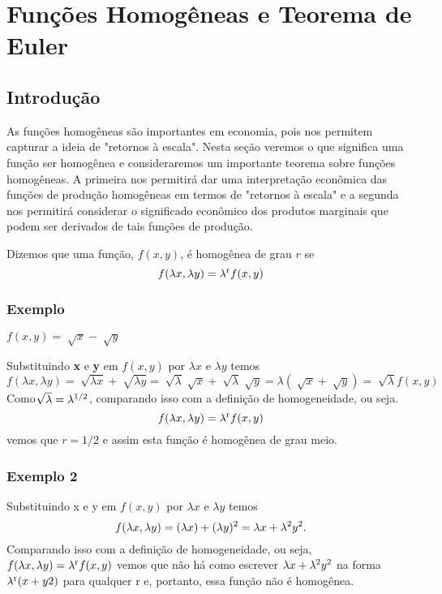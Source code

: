 \documentclass[a4paper]{article}
\begin{document}
\section{Funções Homogêneas e Teorema de Euler}
\subsection*{Introdução}
As funções homogêneas são importantes em economia, pois nos permitem capturar a ideia de "retornos à escala". Nesta seção veremos o que significa uma função ser homogênea e consideraremos um importante teorema sobre funções homogêneas. A primeira nos permitirá dar uma interpretação econômica das funções de produção homogêneas em termos de "retornos à escala" e a segunda nos permitirá considerar o significado econômico dos produtos marginais que podem ser derivados de tais funções de produção.
\par Dizemos que uma função, $f(x,y)$, é homogênea de grau $r$ se
\begin{equation}
    f(\lambda x,\lambda y) = \lambda\textsuperscript{r}f(x,y)
\end{equation}
\subsubsection*{Exemplo}
$f(x,y) = \sqrt[]{x} - \sqrt[]{y}$
\par Substituindo \textbf{x} e \textbf{y} em $f(x,y)$ por $\lambda x$ e $\lambda y$ temos
\begin{equation}
    f(\lambda x,\lambda y)=\sqrt[]{\lambda x} + \sqrt[]{\lambda y} = \sqrt[]{\lambda} \sqrt[]{x} + \sqrt[]{\lambda} \sqrt[]{y} = \lambda(\sqrt[]{x} + \sqrt[]{y}) = \sqrt[]{\lambda}f(x,y)
\end{equation}
Como $\sqrt[]{\lambda} = \lambda\textsuperscript{1/2}$, comparando isso com a definição de homogeneidade, ou seja.
\begin{equation}
    f(\lambda x,\lambda y) = \lambda\textsuperscript{r}f(x,y)
\end{equation}
vemos que $r = 1/2$ e assim esta função é homogênea de grau meio.
\subsubsection*{Exemplo 2}
Substituindo x e y em $f(x,y)$ por $\lambda x$ e $\lambda y$ temos
\begin{equation}
    f(\lambda x,\lambda y) = (\lambda x) + (\lambda y)\textsuperscript{2} = \lambda x + \lambda\textsuperscript{2}y\textsuperscript{2}.
\end{equation}
Comparando isso com a definição de homogeneidade, ou seja, $f(\lambda x,\lambda y) = \lambda\textsuperscript{r}f(x,y)$ vemos que não há como escrever $\lambda x + \lambda\textsuperscript{2}y\textsuperscript{2}$ na forma $\lambda\textsuperscript{r}(x+y2)$ para qualquer r e, portanto, essa função não é homogênea.
\end{document}
